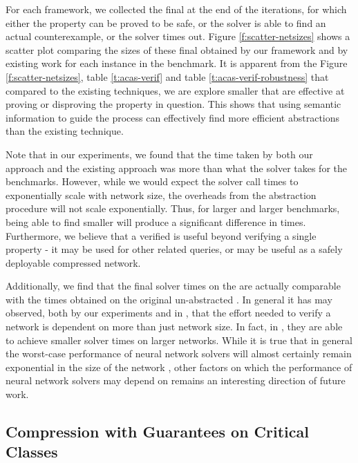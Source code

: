 For each framework, we collected the final \abs at the end of the \cegar
iterations, for which either the property can be proved to be safe, or 
the solver is able to find an actual counterexample, or the solver times out.  
Figure \ref{f:scatter-netsizes} shows a scatter plot comparing the sizes of these final \abs
obtained by our framework and by existing work \cite{cegar-nn} for each instance
in the benchmark. It is apparent from the Figure \ref{f:scatter-netsizes}, 
table \ref{t:acas-verif} and table \ref{t:acas-verif-robustness} that compared 
to the existing techniques, we are explore smaller \abs that are effective 
at proving or disproving the property in question.
This shows that using semantic information to guide the \cegar process can
effectively find more efficient abstractions than the existing technique.

Note that in our experiments, we found that the time taken by both our \cegar
approach and the existing \cegar approach \cite{cegar-nn} was more than what the
\neuralsat solver takes for the \acasxu benchmarks. However, while we would
expect the solver call times to exponentially scale with network size, the
overheads from the abstraction procedure will not scale exponentially. Thus, for
larger and larger benchmarks, being able to find smaller \abs will produce a
significant difference in times. Furthermore, we believe that a verified \abs is
useful beyond verifying a single property - it may be used for other related
queries, or may be useful as a safely deployable compressed network.

Additionally, we find that the final solver times on the \abs are actually
comparable with the times obtained on the original un-abstracted \cnc. In
general it has may observed, both by our experiments and in \cite{cegar-nn},
that the effort needed to verify a network is dependent
on more than just network size. In fact, in \cite{cegar-nn},
they are able to achieve smaller solver times on larger networks. 
While it is true that in general the worst-case performance of neural network
solvers will almost certainly remain exponential in the size of the network
\cite{reluplex}, other factors on which the performance of neural network
solvers may depend on remains an interesting direction of future work. 

\subsection{Compression with Guarantees on Critical Classes}
\label{s:exp-mnist-comp}

